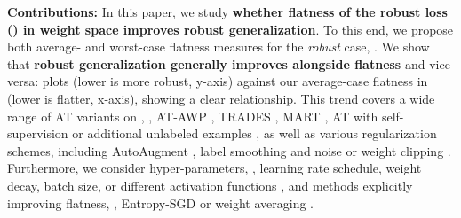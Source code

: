 \textbf{Contributions:} In this paper, we study \textbf{whether flatness of the robust loss (\RCE) in weight space improves robust generalization}. To this end,
we propose both average- and worst-case flatness measures for the \emph{robust} case, . We show that \textbf{robust generalization generally improves alongside flatness} and vice-versa:  plots \RCE (lower is more robust, y-axis) against our average-case flatness in \RCE (lower is flatter, x-axis), showing a clear relationship. 
This trend covers a wide range of AT variants on \CifarT, \eg,  AT-AWP \cite{WuNIPS2020}, TRADES \cite{ZhangICML2019}, MART \cite{WangICLR2020}, AT with self-supervision \cite{HendrycksNIPS2019} or additional unlabeled examples \cite{CarmonNIPS2019,UesatoNIPS2019}, as well as various regularization schemes, including AutoAugment \cite{CubukARXIV2018}, label smoothing \cite{SzegedyCVPR2016} and noise or weight clipping \cite{StutzMLSYS2021}. Furthermore, we consider hyper-parameters, \eg, learning rate schedule, weight decay, batch size, or different activation functions \cite{ElfwingNN2018,MisraBMVC2020,HendrycksARXIV2016}, and methods explicitly improving flatness, \eg, Entropy-SGD \cite{ChaudhariICLR2017} or weight averaging \cite{IzmailovUAI2018}.